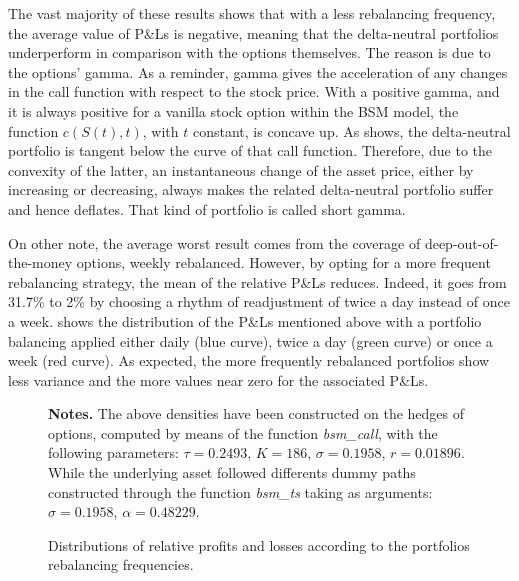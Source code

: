 \documentclass[a4paper, 12pt]{report}
\begin{document}
The vast majority of these results shows that with a less rebalancing frequency, the average value of P\&Ls is negative, meaning that the delta-neutral portfolios underperform in comparison with the options themselves. 
The reason is due to the options' gamma. 
As a reminder, gamma gives the acceleration of any changes in the call function with respect to the stock price.
With a positive gamma, and it is always positive for a vanilla stock option within the BSM model, the function $c(S(t), t)$, with $t$  constant, is concave up. 
As \citet{shreve} shows, the delta-neutral portfolio is tangent below the curve of that call function.
Therefore, due to the convexity of the latter, an instantaneous change of the asset price, either by increasing or decreasing, always makes the related delta-neutral portfolio suffer and hence deflates. 
That kind of portfolio is called short gamma.

















On other note, the average worst result comes from the coverage of deep-out-of-the-money options, weekly rebalanced.
However, by opting for a more frequent rebalancing strategy, the mean of the relative P\&Ls reduces.  
Indeed, it goes from 31.7\% to 2\% by choosing a rhythm of readjustment of twice a day instead of once a week.
 shows the distribution of the P\&Ls mentioned above with a portfolio balancing applied either daily (blue curve), twice a day (green curve) or once a week (red curve).
As expected, the more frequently rebalanced portfolios show less variance and the more values near zero for the associated P\&Ls.

\begin{figure}[h]
  \centering
  
  \caption{Distributions of relative profits and losses according to the portfolios rebalancing frequencies.}
  \begin{changemargin}{0.5cm}{0.5cm}
  \medskip
\footnotesize
{}\textbf{Notes.} The above densities have been constructed on the hedges of options, computed by means of the function \textit{bsm\_call}, with the following parameters: $\tau = 0.2493$, $K = 186$, $\sigma = 0.1958$, $r = 0.01896$. While the underlying asset followed differents dummy paths constructed through the function \textit{bsm\_ts} taking as arguments: $\sigma = 0.1958$, $\alpha = 0.48229$.
  \end{changemargin}
  \label{p:analysis:gbm:pl:better}
\end{figure}
\end{document}

